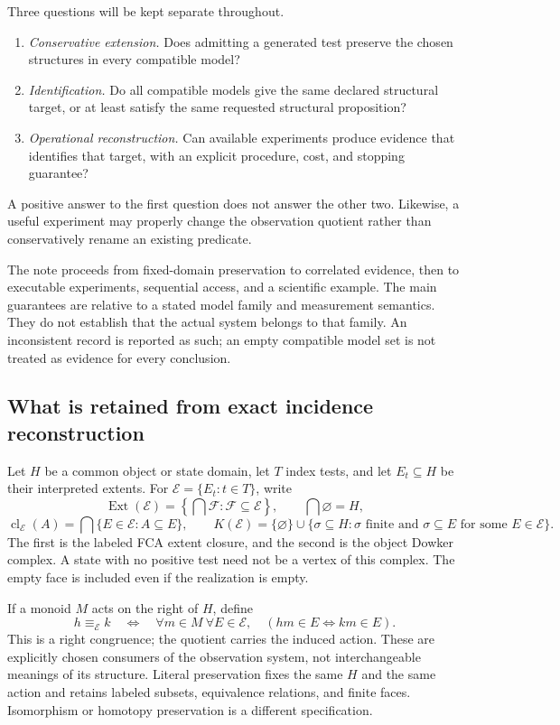 \documentclass[11pt]{article}
\theoremstyle{definition}
\begin{document}
Three questions will be kept separate throughout.
\begin{enumerate}[label=(\roman*)]
\item \emph{Conservative extension.} Does admitting a generated test preserve
      the chosen structures in every compatible model?
\item \emph{Identification.} Do all compatible models give the same
      declared structural target, or at least satisfy the same requested
      structural proposition?
\item \emph{Operational reconstruction.} Can available experiments produce
      evidence that identifies that target, with an explicit procedure,
      cost, and stopping guarantee?
\end{enumerate}
A positive answer to the first question does not answer the other two.
Likewise, a useful experiment may properly change the observation quotient
rather than conservatively rename an existing predicate.

The note proceeds from fixed-domain preservation to correlated evidence,
then to executable experiments, sequential access, and a scientific example.
The main guarantees are relative to a stated model family and measurement
semantics. They do not establish that the actual system belongs to that
family. An inconsistent record is reported as such; an empty compatible
model set is not treated as evidence for every conclusion.

\subsection{What is retained from exact incidence reconstruction}

Let $H$ be a common object or state domain, let $T$ index tests, and let
$E_t\subseteq H$ be their interpreted extents. For
$\mathcal E=\{E_t:t\in T\}$, write
\[
 \operatorname{Ext}(\mathcal E)
 =\left\{\bigcap\mathcal F:\mathcal F\subseteq\mathcal E\right\},
 \qquad \bigcap\varnothing=H,
\]
\[
 \operatorname{cl}_{\mathcal E}(A)
 =\bigcap\{E\in\mathcal E:A\subseteq E\},\qquad
 K(\mathcal E)=\{\varnothing\}\cup
 \{\sigma\subseteq H:\sigma\text{ finite and }
                       \sigma\subseteq E\text{ for some }E\in\mathcal E\}.
\]
The first is the labeled FCA extent closure, and the second is the object
Dowker complex. A state with no positive test need not be a vertex of this
complex. The empty face is included even if the realization is empty.

If a monoid $M$ acts on the right of $H$, define
\[
 h\equiv_{\mathcal E}k
 \quad\Longleftrightarrow\quad
 \forall m\in M\ \forall E\in\mathcal E,
 \quad (hm\in E\Longleftrightarrow km\in E).
\]
This is a right congruence; the quotient carries the induced action.
These are explicitly chosen consumers of the observation system, not
interchangeable meanings of its structure. Literal preservation fixes the
same $H$ and the same action and retains labeled subsets, equivalence
relations, and finite faces. Isomorphism or homotopy preservation is a
different specification.
\end{document}
